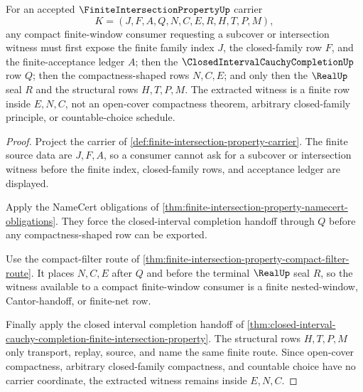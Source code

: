 \begin{theorem}
\label{thm:finite-intersection-property-compact-subcover-extraction}
For an accepted $\FiniteIntersectionPropertyUp$ carrier
$$
K=(J,F,A,Q,N,C,E,R,H,T,P,M),
$$
any compact finite-window consumer requesting a subcover or intersection witness must first expose the finite family index $J$, the closed-family row $F$, and the finite-acceptance ledger $A$; then the $\ClosedIntervalCauchyCompletionUp$ row $Q$; then the compactness-shaped rows $N,C,E$; and only then the $\RealUp$ seal $R$ and the structural rows $H,T,P,M$. The extracted witness is a finite row inside $E,N,C$, not an open-cover compactness theorem, arbitrary closed-family principle, or countable-choice schedule.
\end{theorem}
\begin{proof}
Project the carrier of \autoref{def:finite-intersection-property-carrier}. The finite source data are $J,F,A$, so a consumer cannot ask for a subcover or intersection witness before the finite index, closed-family rows, and acceptance ledger are displayed.

Apply the NameCert obligations of \autoref{thm:finite-intersection-property-namecert-obligations}. They force the closed-interval completion handoff through $Q$ before any compactness-shaped row can be exported.

Use the compact-filter route of \autoref{thm:finite-intersection-property-compact-filter-route}. It places $N,C,E$ after $Q$ and before the terminal $\RealUp$ seal $R$, so the witness available to a compact finite-window consumer is a finite nested-window, Cantor-handoff, or finite-net row.

Finally apply the closed interval completion handoff of \autoref{thm:closed-interval-cauchy-completion-finite-intersection-property}. The structural rows $H,T,P,M$ only transport, replay, source, and name the same finite route. Since open-cover compactness, arbitrary closed-family compactness, and countable choice have no carrier coordinate, the extracted witness remains inside $E,N,C$.
\end{proof}


